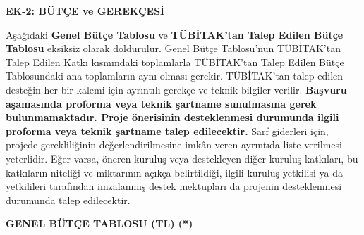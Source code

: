 \setcounter{page}{1}
\textbf{EK-2: BÜTÇE ve GEREKÇESİ}

\vspace*{0.1in}

Aşağıdaki \textbf{Genel Bütçe Tablosu} ve \textbf{TÜBİTAK'tan Talep Edilen Bütçe Tablosu} eksiksiz olarak doldurulur. Genel Bütçe Tablosu'nun TÜBİTAK'tan Talep Edilen Katkı kısmındaki toplamlarla TÜBİTAK'tan Talep Edilen Bütçe Tablosundaki ana toplamların aynı olması gerekir. TÜBİTAK'tan talep edilen desteğin her bir kalemi için ayrıntılı gerekçe ve teknik bilgiler verilir. \textbf{Başvuru aşamasında proforma veya teknik şartname sunulmasına gerek bulunmamaktadır. Proje önerisinin desteklenmesi durumunda ilgili proforma veya teknik şartname talep edilecektir.} Sarf giderleri için, projede gerekliliğinin değerlendirilmesine imkân veren ayrıntıda liste verilmesi yeterlidir. Eğer varsa, öneren kuruluş veya destekleyen diğer kuruluş katkıları, bu katkıların niteliği ve miktarının açıkça belirtildiği, ilgili kuruluş yetkilisi ya da yetkilileri tarafından imzalanmış destek mektupları da projenin desteklenmesi durumunda talep edilecektir.


\begin{center}
    \textbf{GENEL BÜTÇE TABLOSU (TL) (*)}
\end{center}

